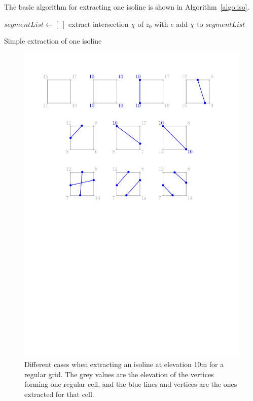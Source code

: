 %

The basic algorithm for extracting one isoline is shown in Algorithm~\ref{algo:iso}.
\begin{algorithm}[tb] 
  $segmentList \leftarrow [\;]$ \;
  {
    {
      extract intersection $\chi$ of $z_0$ with $e$\;
      add $\chi$ to $segmentList$\;
    }
  }
  \caption{Simple extraction of one isoline}
\label{algo:iso}
\end{algorithm} 
\begin{figure}
  \centering
  \includegraphics[width=0.95\linewidth]{figs/isoline-square}
\caption{Different cases when extracting an isoline at elevation 10m for a regular grid. The grey values are the elevation of the vertices forming one regular cell, and the blue lines and vertices are the ones extracted for that cell.}
\label{fig:rasterconfs}
\end{figure}
